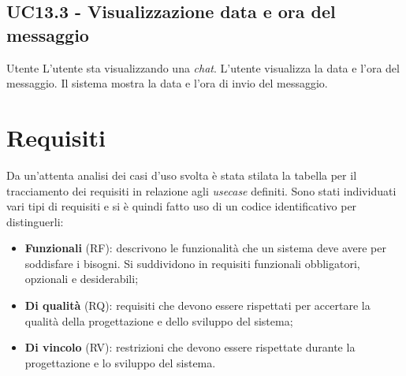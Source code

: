 \subsection{UC13.3 - Visualizzazione data e ora del messaggio}
\label{13.3}
\makeUC{}
{Utente}
{L'utente sta visualizzando una \textit{chat}.}
{L'utente visualizza la data e l'ora del messaggio.}
{Il sistema mostra la data e l'ora di invio del messaggio.}{}{}{}{}

\section{Requisiti}
Da un'attenta analisi dei casi d'uso svolta è stata stilata la tabella per 
il tracciamento dei requisiti in relazione agli \textit{usecase} definiti. 
Sono stati individuati vari tipi di requisiti e si è quindi fatto uso di un codice identificativo per distinguerli:
\begin{itemize}
    \item \textbf{Funzionali} (RF): descrivono le funzionalità che un sistema deve avere per soddisfare i bisogni. Si suddividono in requisiti funzionali obbligatori, opzionali e desiderabili;
    \item \textbf{Di qualità} (RQ): requisiti che devono essere rispettati per accertare la qualità della progettazione e dello sviluppo del sistema;
    \item \textbf{Di vincolo} (RV): restrizioni che devono essere rispettate durante la progettazione e lo sviluppo del sistema.
\end{itemize}
